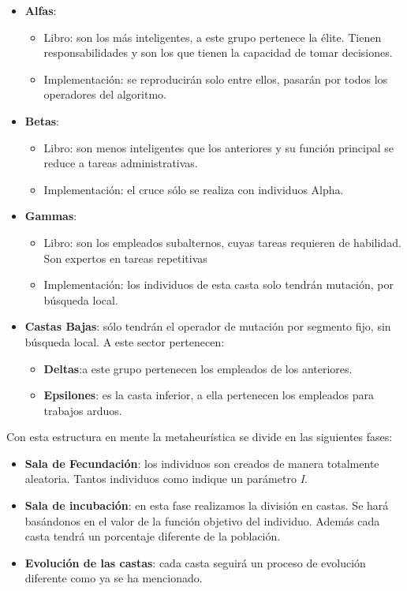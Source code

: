 \begin{itemize}
    \item \textbf{Alfas}:
        \begin{itemize}
            \item Libro: son los más inteligentes, a este grupo pertenece la élite. Tienen responsabilidades y son
            los que tienen la capacidad de tomar decisiones.
            \item Implementación: se reproducirán solo entre ellos, pasarán por todos los operadores del algoritmo.
        \end{itemize}
    \item \textbf{Betas}: 
        \begin{itemize}
            \item Libro: son menos inteligentes que los anteriores y su función principal se reduce a tareas
            administrativas.
            \item  Implementación: el cruce sólo se realiza con individuos Alpha.
        \end{itemize}
    \item \textbf{Gammas}: 
        \begin{itemize}
            \item Libro: son los empleados subalternos, cuyas tareas requieren de habilidad. Son expertos en tareas repetitivas
            \item Implementación: los individuos de esta casta solo tendrán mutación, por búsqueda local.
        \end{itemize}
    \item \textbf{Castas Bajas}: sólo tendrán el operador de mutación por segmento fijo, sin búsqueda local. A este sector pertenecen:
        \begin{itemize}
            \item \textbf{Deltas}:a este grupo pertenecen los empleados de los anteriores.
            \item \textbf{Epsilones}: es la casta inferior, a ella pertenecen los empleados para trabajos arduos.
        \end{itemize}
\end{itemize}

Con esta estructura en mente la metaheurística se divide en las siguientes fases:

\begin{itemize}
    \item \textbf{Sala de Fecundación}: los individuos son creados de manera totalmente aleatoria. Tantos individuos
    como indique un parámetro \textit{I}.
    \item \textbf{Sala de incubación}: en esta fase realizamos la división en castas. Se hará basándonos en el valor de
    la función objetivo del individuo. Además cada casta tendrá un porcentaje diferente de la población.
    \item \textbf{Evolución de las castas}: cada casta seguirá un proceso de evolución diferente como ya se 
    ha mencionado.
\end{itemize}

